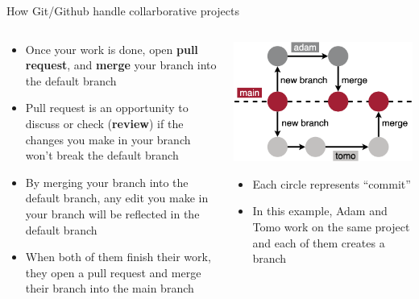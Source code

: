\documentclass[handout,pdftex,10pt,aspectratio=169]{beamer}
\begin{document}
\begin{frame}{How Git/Github handle collarborative projects}
  \begin{columns}[c]
    \begin{column}{0.55\linewidth}
      \begin{itemize}[<+->] \setlength\itemsep{10pt}
        \item Once your work is done, open \textbf{pull request}, and \textbf{merge} your branch
        into the default branch
        \item Pull request is an opportunity to discuss or check (\textbf{review})
        if the changes you make in your branch won't break the default branch
        \item By merging your branch into the default branch, any edit you make in your branch
        will be reflected in the default branch
        \item When both of them finish their work, they open a pull request and
        merge their branch into the main branch
      \end{itemize}
    \end{column} \hfill
    \begin{column}{0.44\linewidth}
      \includegraphics[width = \linewidth]{github_branch.png}
      \begin{itemize}
        \item Each circle represents ``commit''
        \item In this example, Adam and Tomo work on the same project and
        each of them creates a branch
      \end{itemize}
    \end{column}
  \end{columns}
\end{frame}
\end{document}
